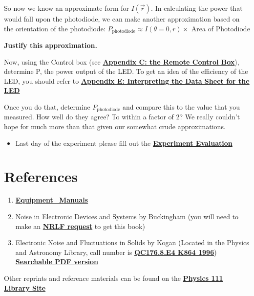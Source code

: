 \documentclass{../lab}
\begin{document}
So now we know an approximate form for $I(\vec{r})$. In calculating the power that would fall upon the photodiode, we can make another approximation based on the orientation of the photodiode: $P_\text{photodiode} \approx I(\theta = 0, r) \times$ Area of Photodiode

\textbf{Justify this approximation.}

Now, using the Control box (see \href{http://experimentationlab.berkeley.edu/node/98}{\textbf{Appendix C: the Remote Control Box}}), determine P, the power output of the LED. To get an idea of the efficiency of the LED, you should refer to \href{http://experimentationlab.berkeley.edu/node/100}{\textbf{Appendix E: Interpreting the Data Sheet for the LED}}

Once you do that, determine $P_\text{photodiode}$ and compare this to the value that you measured. How well do they agree? To within a factor of 2? We really couldn't hope for much more than that given our somewhat crude approximations.

\begin{itemize}
    \item Last day of the experiment please fill out the \href{\ExperimentEvaluation}{\textbf{Experiment Evaluation}}

\end{itemize}

\section{References}
\label{sec:References}

\begin{enumerate}
    \item \href{http://physics111.lib.berkeley.edu/Physics111/Equipment\_Manuals/LLS/indexequipLLS.html}{\textbf{Equipment\_Manuals}}

    \item Noise in Electronic Devices and Systems by Buckingham (you will need to make an \href{http://oskicat.berkeley.edu/screens/help\_borrowing.html#nrlfrequest}{\textbf{NRLF request}} to get this book)

    \item Electronic Noise and Fluctuations in Solids by Kogan (Located in the Physics and Astronomy Library, call number is \href{http://oskicat.berkeley.edu/search\~S1?/cQC176.8.E4+K864+1996/cqc++176.8+e4+k864+1996/-3,-1,,B/browse}{\textbf{QC176.8.E4 K864 1996}}) \href{http://physics111.lib.berkeley.edu/Physics111/Reprints/LLS/Electronic\%20Noise\%20and\%20Fluctuations\%20in\%20Solids_Kogan.pdf}{\textbf{Searchable PDF version}}

\end{enumerate}

\noindent Other reprints and reference materials can be found on the \href{http://physics111.lib.berkeley.edu/Physics111/Reprints/LLS/LLS\_index.html}{\textbf{Physics 111 Library Site}}
\end{document}
